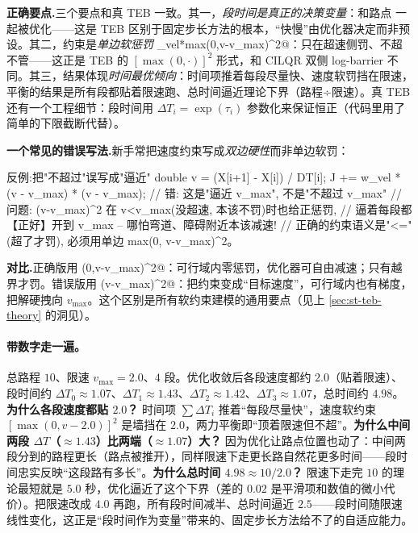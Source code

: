 \noindent\textbf{正确要点.}\;三个要点和真 TEB 一致。其一，\emph{段时间是真正的决策变量}：\verb@dT@ 和路点 \verb@x@ 一起被优化——这是 TEB 区别于固定步长方法的根本，“快慢”由优化器决定而非预设。其二，约束是\emph{单边软惩罚} \verb@w_vel*max(0,v-v_max)^2@：只在超速侧罚、不超不管——这正是 TEB 的 $[\max(0,\cdot)]^2$ 形式，和 CILQR 双侧 log-barrier 不同。其三，结果体现\emph{时间最优倾向}：时间项推着每段尽量快、速度软罚挡在限速，平衡的结果是所有段都贴着限速跑、总时间逼近理论下界（路程÷限速）。真 TEB 还有一个工程细节：段时间用 $\Delta T_i=\exp(\tau_i)$ 参数化来保证恒正（代码里用了简单的下限截断代替）。

\noindent{}\textbf{一个常见的错误写法.}\;新手常把速度约束写成\emph{双边硬性}而非单边软罚：

\begin{codebox}[C++]{反例:把"不超过"误写成"逼近"}
double v = (X[i+1] - X[i]) / DT[i];
J += w_vel * (v - v_max) * (v - v_max);   // 错: 这是"逼近 v_max", 不是"不超过 v_max"
// 问题: (v-v_max)^2 在 v<v_max(没超速, 本该不罚)时也给正惩罚,
//       逼着每段都【正好】开到 v_max -- 哪怕弯道、障碍附近本该减速!
//       正确的约束语义是"<="(超了才罚), 必须用单边 max(0, v-v_max)^2。
\end{codebox}

\noindent\textbf{对比.}\;正确版用 \verb@max(0,v-v_max)^2@：可行域内零惩罚，优化器可自由减速；只有越界才罚。错误版用 \verb@(v-v_max)^2@：把约束变成“目标速度”，可行域内也有梯度，把解硬拽向 $v_{\max}$。这个区别是所有软约束建模的通用要点（见上 \cref{sec:st-teb-theory} 的洞见）。

\paragraph{带数字走一遍。}
总路程 $10$、限速 $v_{\max}=2.0$、$4$ 段。优化收敛后各段速度都约 $2.0$（贴着限速）、段时间约 $\Delta T_0\approx1.07$、$\Delta T_1\approx1.43$、$\Delta T_2\approx1.42$、$\Delta T_3\approx1.07$，总时间约 $4.98$。\textbf{为什么各段速度都贴 $2.0$？} 时间项 $\sum\Delta T_i$ 推着“每段尽量快”，速度软约束 $[\max(0,v-2.0)]^2$ 是墙挡在 $2.0$，两力平衡即“顶着限速但不超”。\textbf{为什么中间两段 $\Delta T$（$\approx1.43$）比两端（$\approx1.07$）大？} 因为优化让路点位置也动了：中间两段分到的路程更长（路点被推开），同样限速下走更长路自然花更多时间——段时间忠实反映“这段路有多长”。\textbf{为什么总时间 $4.98\approx 10/2.0$？} 限速下走完 $10$ 的理论最短就是 $5.0$ 秒，优化逼近了这个下界（差的 $0.02$ 是平滑项和数值的微小代价）。把限速改成 $4.0$ 再跑，所有段时间减半、总时间逼近 $2.5$——段时间随限速线性变化，这正是“段时间作为变量”带来的、固定步长方法给不了的自适应能力。

